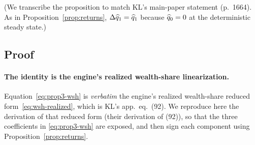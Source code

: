 \noindent (We transcribe the proposition to match KL's main-paper statement
(p.~1664). As in Proposition~\ref{prop:returns}, $\Delta\widehat{q}_1=\widehat{q}_1$
because $\widehat{q}_0=0$ at the deterministic steady state.)

\subsection{Proof}

\paragraph{The identity is the engine's realized wealth-share linearization.}
Equation~\eqref{eq:prop3-wsh} is \emph{verbatim} the engine's realized
wealth-share reduced form~\eqref{eq:wsh-realized}, which is KL's app.~eq.~(92).
We reproduce here the derivation of that reduced form (their derivation of (92)),
so that the three coefficients in \eqref{eq:prop3-wsh} are exposed, and then sign
each component using Proposition~\ref{prop:returns}.

